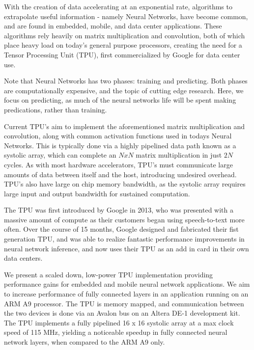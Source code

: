 \documentclass[11pt, conference, onecolumn]{IEEEtran}
\begin{document}
    With the creation of data accelerating at an exponential rate, algorithms to
    extrapolate useful information - namely Neural Networks, have become
    common, and are found in embedded, mobile, and data center applications. These
    algorithms rely heavily on matrix multiplication and convolution, both of which place
    heavy load on today's general purpose processors, creating the need for a Tensor
    Processing Unit (TPU), first commercialized by Google for data center use.

    Note that Neural Networks has two phases: training and predicting. Both phases are
    computationally expensive, and the topic of cutting edge research. Here, we focus
    on predicting, as much of the neural networks life will be spent making predications,
    rather than training.

    Current TPU's aim to implement the aforementioned matrix multiplication and
    convolution, along with common activation functions used in todays Neural Networks.
    This is typically done via a highly pipelined data path known as a systolic array,
    which can complete an $N x N$ matrix multiplication in just $2N$ cycles. As with most
    hardware accelerators, TPU's must communicate large amounts of data between itself and
    the host, introducing undesired overhead. TPU's also have large on chip memory
    bandwidth, as the systolic array requires large input and output bandwidth for sustained
    computation.

    The TPU was first introduced by Google in 2013, who was presented with a massive
    amount of compute as their customers began using speech-to-text more often. Over the
    course of 15 months, Google designed and fabricated their fist generation TPU, and
    was able to realize fantastic performance improvements in neural network inference,
    and now uses their TPU as an add in card in their own data centers.

    We present a scaled down, low-power TPU implementation providing performance gains for
    embedded and mobile neural network applications. We aim to increase performance of
    fully connected layers in an application running on an ARM A9 processor. The TPU is
    memory mapped, and communication between the two devices is done via an Avalon bus on
    an Altera DE-1 development kit. The TPU implements a fully pipelined 16 x 16 systolic
    array at a max clock speed of 115 MHz, yielding a noticeable speedup in
    fully connected neural network layers, when compared to the ARM A9 only.
\end{document}
